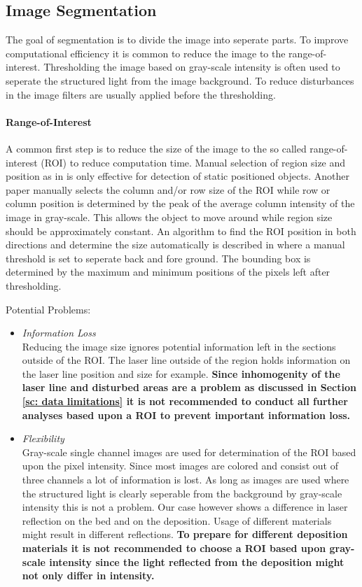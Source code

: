 \subsection*{Image Segmentation}
The goal of segmentation is to divide the image into seperate parts. To improve computational efficiency it is common to reduce the image to the range-of-interest. Thresholding the image based on gray-scale intensity is often used to seperate the structured light from the image background. To reduce disturbances in the image filters are usually applied before the thresholding.

\paragraph{Range-of-Interest}
A common first step is to reduce the size of the image to the so called range-of-interest (ROI) to reduce computation time. Manual selection of region size and position as in \cite{huang2012development} is only effective for detection of static positioned objects. Another paper \cite{wang2014weld} manually selects the column and/or row size of the ROI while row or column position is determined by the peak of the average column intensity of the image in gray-scale. This allows the object to move around while region size should be approximately constant. An algorithm to find the ROI position in both directions and determine the size automatically is described in \cite{xu2004features} where a manual threshold is set to seperate back and fore ground. The bounding box is determined by the maximum and minimum positions of the pixels left after thresholding. 

\skippar
Potential Problems:
\begin{itemize}
\item \textit{Information Loss} \label{pblm: info_loss} \\
Reducing the image size ignores potential information left in the sections outside of the ROI. The laser line outside of the region holds information on the laser line position and size for example. \textbf{Since inhomogenity of the laser line and disturbed areas are a problem as discussed in Section \ref{sc: data limitations} it is not recommended to conduct all further analyses based upon a ROI to prevent important information loss.}
\item \textit{Flexibility} \label{pblm: flexibility} \\
Gray-scale single channel images are used for determination of the ROI based upon the pixel intensity. Since most images are colored and consist out of three channels a lot of information is lost. As long as images are used where the structured light is clearly seperable from the background by gray-scale intensity this is not a problem. Our case however shows a difference in laser reflection on the bed and on the deposition. Usage of different materials might result in different reflections. \textbf{To prepare for different deposition materials it is not recommended to choose a ROI based upon gray-scale intensity since the light reflected from the deposition might not only differ in intensity.} 
\end{itemize}

